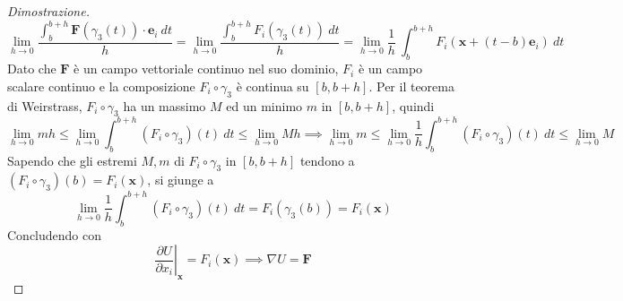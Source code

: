 \begin{proof}[Dimostrazione]
                \[
                    \lim_{h \rightarrow 0} \frac{\displaystyle \int_{b}^{b+h} \mathbf{F}(\gamma_3(t)) \cdot \mathbf{e}_{i} \: dt}{h} = \lim_{h \rightarrow 0} \frac{\displaystyle \int_{b}^{b+h} F_{i}(\gamma_3(t)) \: dt}{h} = \lim_{h \rightarrow 0} \frac{1}{h} \: \int_{b}^{b+h}  F_{i}(\mathbf{x} + (t - b)\mathbf{e}_{i}) \: dt
                \]
                Dato che $\mathbf{F}$ è un campo vettoriale continuo nel suo dominio, $F_{i}$ è un campo scalare continuo e la composizione $F_{i} \circ \gamma_{3}$ è continua su $[b, b + h]$.
                Per il teorema di Weirstrass, $F_{i} \circ \gamma_{3}$ ha un massimo $M$ ed un minimo $m$ in $[b, b+h]$, quindi
                \[
                    \lim_{h \rightarrow 0} mh \leq \lim_{h \rightarrow 0} \int_{b}^{b+h} (F_{i} \circ \gamma_{3})(t) \: dt \leq \lim_{h \rightarrow 0} Mh \implies \lim_{h \rightarrow 0} m \leq \lim_{h \rightarrow 0} \frac{1}{h} \int_{b}^{b+h} (F_{i} \circ \gamma_{3})(t) \: dt \leq \lim_{h \rightarrow 0} M
                \]
                Sapendo che gli estremi $M, m$ di $F_{i} \circ \gamma_{3}$ in $[b, b+h]$ tendono a $(F_{i} \circ \gamma_{3})(b) = F_{i}(\mathbf{x})$, si giunge a
                \[
                    \lim_{h \rightarrow 0} \frac{1}{h} \int_{b}^{b+h} (F_{i} \circ \gamma_{3})(t) \: dt = F_{i}(\gamma_{3}(b)) = F_{i}(\mathbf{x})
                \]
                Concludendo con
                \[
                    \left. \frac{\partial U}{\partial x_{i}} \right|_{\mathbf{x}} = F_{i}(\mathbf{x}) \implies \nabla U = \mathbf{F}
                \]


\end{proof}

